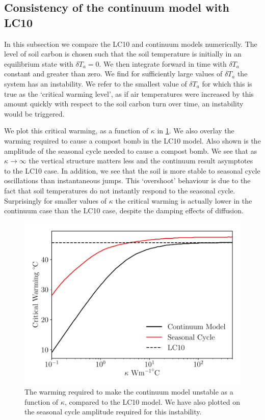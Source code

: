 \subsection{Consistency of the continuum model with LC10}
\label{sec:consistency_with_LC10}
In this subsection we compare the LC10 and continuum models numerically. The level of soil carbon is chosen such that the soil temperature is initially in an equilibrium state with $\delta T_{a} = 0$.
We then integrate forward in time with $\delta T_a$ constant and greater than zero. We find for sufficiently large values of $\delta T_a$ the system has an instability.
We refer to the smallest value of $\delta T_a$ for which this is true as the `critical warming level', as if air temperatures were increased by this amount quickly with respect to the soil carbon turn over time,
an instability would be triggered.

We plot this critical warming, as a function of $\kappa$ in \cref{fig:comparison_with_lc10}. We also overlay the warming required to cause a compost bomb in the LC10
model. Also shown is the amplitude of the seasonal cycle needed to cause a compost bomb.
We see that as $\kappa\rightarrow\infty$ the vertical structure matters less and the continuum result asymptotes to the LC10 case. In addition, we see that the soil is more stable
to seasonal cycle oscillations than instantaneous jumps. This `overshoot' behaviour\cite{Ritchie2019,Ritchie2021} is due to the fact that soil temperatures do not instantly respond to the seasonal cycle.
Surprisingly for smaller
values of $\kappa$ the critical warming is actually lower in the continuum case than the LC10 case, despite the damping effects of diffusion.
\begin{figure}
  \centering
  \includegraphics[keepaspectratio,scale=0.5]{dimensional_continuum_vs_lc10}
  \caption{The warming required to make the continuum model unstable as a function of $\kappa$, compared to the LC10 model. We have also plotted on the seasonal cycle amplitude required for this instability.}
  \label{fig:comparison_with_lc10}
\end{figure}

